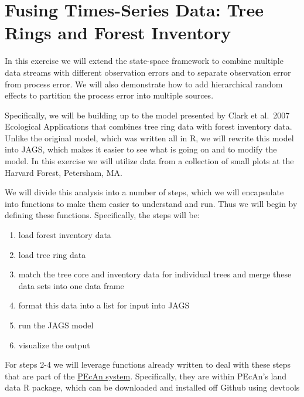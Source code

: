\documentclass[]{article}
\title{}
\author{}
\date{}
\providecommand{\tightlist}{%
  \setlength{\itemsep}{0pt}\setlength{\parskip}{0pt}}
\begin{document}
\hypertarget{fusing-times-series-data-tree-rings-and-forest-inventory}{%
\section{Fusing Times-Series Data: Tree Rings and Forest
Inventory}\label{fusing-times-series-data-tree-rings-and-forest-inventory}}

In this exercise we will extend the state-space framework to combine
multiple data streams with different observation errors and to separate
observation error from process error. We will also demonstrate how to
add hierarchical random effects to partition the process error into
multiple sources.

Specifically, we will be building up to the model presented by Clark et
al.~2007 Ecological Applications that combines tree ring data with
forest inventory data. Unlike the original model, which was written all
in R, we will rewrite this model into JAGS, which makes it easier to see
what is going on and to modify the model. In this exercise we will
utilize data from a collection of small plots at the Harvard Forest,
Petersham, MA.

We will divide this analysis into a number of steps, which we will
encapsulate into functions to make them easier to understand and run.
Thus we will begin by defining these functions. Specifically, the steps
will be:

\begin{enumerate}
\def\labelenumi{\arabic{enumi}.}
\tightlist
\item
  load forest inventory data
\item
  load tree ring data
\item
  match the tree core and inventory data for individual trees and merge
  these data sets into one data frame
\item
  format this data into a list for input into JAGS
\item
  run the JAGS model
\item
  visualize the output
\end{enumerate}

For steps 2-4 we will leverage functions already written to deal with
these steps that are part of the \href{https://pecanproject.org}{PEcAn
system}. Specifically, they are within PEcAn's land data R package,
which can be downloaded and installed off Github using devtools
\end{document}

